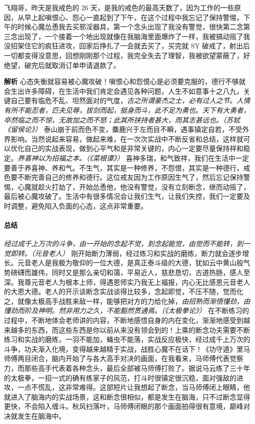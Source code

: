 \begin{case}
    飞翔哥，昨天是我戒色的 26 天，是我的戒色的最高天数了，因为工作的一些原因，从早上起嗔恨心、怨心一直起到了下午，在这个过程中我忘记了保持警惕，下午的时候心魔怂恿我去买邪淫器具，第一个念头出现了我没有警觉，很快第二念第三念出现了，一个接着一个地出现就像在我脑海里面爆炸了一样，我被搞动摇了我没招架住它的疯狂进攻，回家后挣扎了一会就去买了，买完就 SY 破戒了，射出后一切都变得没意思，回想刚刚那个过程，我完全失去了理智，我被欲望蒙蔽了，好绝望，破完后就取消订单申请退款了。

    \textbf{解析} 心态失衡就容易被心魔攻破！嗔恨心和怨恨心是必须要克服的，德行不够就会生出许多障碍，在生活中我们肯定会遇见各种问题，人生不如意事十之八九，关键自己要有临危不乱、坦然面对的气度，\textit{古之所谓豪杰之士，必有过人之节。人情有所不能忍者，匹夫见辱，拔剑而起，挺身而斗，此不足为勇也。天下有大勇者，卒然临之而不惊，无故加之而不怒；此其所挟持者甚大，而其志甚远也。（苏轼《留侯论》）} 泰山崩于前而色不变，麋鹿兴于左而目不瞬，遇事镇定自若，不受外界影响。当然说起来容易，做起来难，在一次次实战中不断反省和总结，这样就可以优化自己的实战表现，做到心平气和是非常关键的，内心一定要尽量保持祥和稳定。\textit{养喜神以为招福之本。（《菜根谭》）} 喜神多瑞，和气致祥，我们在生活中一定要善于养喜神、养和气。不生气，其实是一种修养，不怨恨，其实是一种德行，戒色要不断完善自己的修养和德行。这位戒友因为工作原因生气了，然后忘记保持警惕，心魔就趁火打劫了，开始怂恿他，他没有警觉，没有立刻断念，继而动摇了，最后被心魔攻破了。生活中有很多情况会让我们生气，让我们失控，我们一定要及时调整，避免陷入负面的心态，这点非常重要。
\end{case}

\paragraph*{总结}

\textit{经过成千上万次的斗争，由一开始的念起不觉，到念起能觉，由觉而不能转，到一觉即转。（元音老人）} 刚开始断力薄弱，经过练习和实战的磨练，断力就会逐步增长。元音老人是我极为敬仰的一位大德，是真正泰斗级的大德，犹如云中黄山般气势磅礴而雄伟，同时又是那么亲切和蔼，平易近人，慈悲恳切，古道热肠，感人至深。我尊元音老人为根本上师，得遇恩师实乃我无上福报，内心无比感恩元音老人的大恩大德。老人的开示谈断念实战谈得比较多，念起即觉，不压不随，觉而化之，就像太极高手战胜来敌一样，能够把对方的力给化掉，\textit{由招熟而渐悟懂劲，由懂劲而阶及神明。然非用力之久，不能豁然贯通焉。（《太极拳论》）} 在不断练习的过程中，不断地体会老师讲的内容，不断地感悟自身的内在变化，渐渐地感受到越来越多的东西，而这些东西是你以前从来没有领会到的！上乘的断念功夫需要不断练习和实战的磨练，一羽不能加，蝇虫不能落，实战反应极快，经过成千上万次的斗争，功夫渐入化境，变得越来越精于实战，战胜心魔不在话下！《功守道》里马师傅两目闭合，脑内开始了与各大高手对决的画面，在我看来，马师傅代表觉察力，而那些高手代表着各种念头，最后全部被马师傅打败了。据说马云练了三十年的太极拳，一招一式的确有练家子的风范，打斗时很镇定很沉稳，面对强敌的进攻，一点不慌乱，这非常难得。这部短片让我想起了断念，当马师傅闭上眼睛，他就进入了脑海内的实战场景，这和断念很相似，都是发生在脑海，只不过断念显得更快，不会陷入缠斗。秋风扫落叶，马师傅闭眼的那个画面拍得很有意境，巅峰对决就发生在脑海中。

